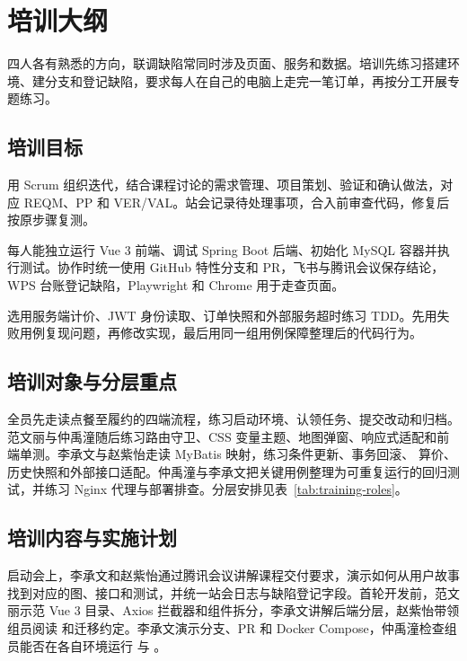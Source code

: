 \section{培训大纲}

四人各有熟悉的方向，联调缺陷常同时涉及页面、服务和数据。培训先练习搭建环境、建分支和登记缺陷，要求每人在自己的电脑上走完一笔订单，再\mbox{按分工开展专题练习}。

\subsection{培训目标}

\begin{reportpoints}
\item 用 Scrum 组织迭代，结合课程讨论的需求管理、项目策划、验证和确认做法，对应 REQM、PP 和 VER/VAL。站会记录待处理事项，合入前审查代码，修复后按原步骤复测。
\item 每人能独立运行 Vue 3 前端、调试 Spring Boot 后端、初始化 MySQL 容器并执行测试。协作时统一使用 GitHub 特性分支和 PR，飞书与腾讯会议保存结论，WPS 台账登记缺陷，Playwright 和 Chrome 用于走查页面。
\item 选用服务端计价、JWT 身份读取、订单快照和外部服务超时练习 TDD。先用失败用例复现问题，再修改实现，最后用同一组用例保障整理后的代码行为。
\end{reportpoints}

\subsection{培训对象与分层重点}

全员先走读点餐至履约的四端流程，练习启动环境、认领任务、提交改动和归档。范文丽与仲禹潼随后练习路由守卫、CSS 变量主题、地图弹窗、响应式适配和前端单测。李承文与赵紫怡走读 MyBatis 映射，练习条件更新、事务回滚、 算价、历史快照和外部接口适配。仲禹潼与李承文把关键用例整理为可重复运行的回归测试，并练习 Nginx 代理与部署排查。分层安排见表~\ref{tab:training-roles}。

\subsection{培训内容与实施计划}

启动会上，李承文和赵紫怡通过腾讯会议讲解课程交付要求，演示如何从用户故事找到对应的图、接口和测试，并统一站会日志与缺陷登记字段。首轮开发前，范文丽示范 Vue 3 目录、Axios 拦截器和组件拆分，李承文讲解后端分层，赵紫怡带领组员阅读  和迁移约定。李承文演示分支、PR 和 Docker Compose，仲禹潼检查组员能否在各自环境运行  与 。

